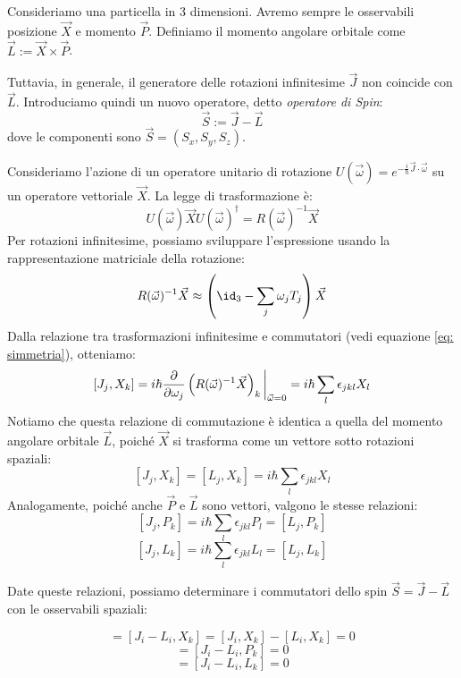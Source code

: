 Consideriamo una particella in 3 dimensioni. Avremo sempre le osservabili posizione \(\vec{X}\) e momento \(\vec{P}\).
Definiamo il momento angolare orbitale come \(\vec{L} := \vec{X} \times \vec{P}\).

Tuttavia, in generale, il generatore delle rotazioni infinitesime \(\vec{J}\) non coincide con \(\vec{L}\). Introduciamo quindi un nuovo operatore, detto \textit{operatore di Spin}:
\begin{equation}
    \vec{S} := \vec{J} - \vec{L} 
\end{equation}
dove le componenti sono \(\vec{S} = (S_x, S_y, S_z)\).

Consideriamo l'azione di un operatore unitario di rotazione \(U(\vec{\omega}) = e^{-\frac{i}{\hbar}\vec{J}\cdot\vec{\omega}}\) su un operatore vettoriale \(\vec{X}\). 
La legge di trasformazione è:
\[
U(\vec{\omega})\vec{X}U(\vec{\omega})^\dagger = R(\vec{\omega})^{-1}\vec{X}
\]
Per rotazioni infinitesime, possiamo sviluppare l'espressione usando la rappresentazione matriciale della rotazione:
\[
R(\vec{\omega})^{-1}\vec{X} \approx \left( \id_3 - \sum_j \omega_j T_j \right)\vec{X}
\]
Dalla relazione tra trasformazioni infinitesime e commutatori (vedi equazione \ref{eq: simmetria}), otteniamo:
\[
[J_j, X_k] = i\hbar \pdv{}{\omega_j} \left( R(\vec{\omega})^{-1}\vec{X} \right)_k \bigg|_{\vec{\omega}=0} = i\hbar \sum_l \epsilon_{jkl} X_l
\]
Notiamo che questa relazione di commutazione è identica a quella del momento angolare orbitale \(\vec{L}\), poiché \(\vec{X}\) si trasforma come un vettore sotto rotazioni spaziali:
\[
[J_j, X_k] = [L_j, X_k] = i\hbar \sum_l \epsilon_{jkl} X_l
\]
Analogamente, poiché anche \(\vec{P}\) e \(\vec{L}\) sono vettori, valgono le stesse relazioni:
\[
[J_j, P_k] = i\hbar \sum_l \epsilon_{jkl} P_l = [L_j, P_k]
\]
\[
[J_j, L_k] = i\hbar \sum_l \epsilon_{jkl} L_l = [L_j, L_k]
\]

Date queste relazioni, possiamo determinare i commutatori dello spin \(\vec{S} = \vec{J} - \vec{L}\) con le osservabili spaziali:

\begin{equation}
    [S_i, X_k] = [J_i - L_i, X_k] = [J_i, X_k] - [L_i, X_k] = 0
\end{equation}
\begin{equation}
    [S_i, P_k] = [J_i - L_i, P_k] = 0
\end{equation}
\begin{equation}
    [S_i, L_k] = [J_i - L_i, L_k] = 0
\end{equation}

